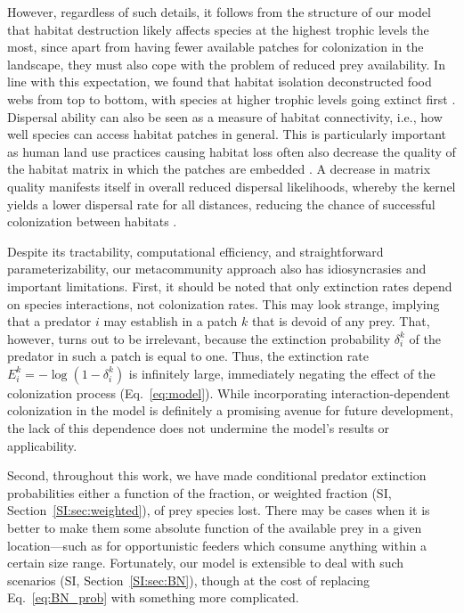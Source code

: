 \documentclass[11pt]{article}
\newcommand{\SI}{SI}
\begin{document}
However, regardless of such details, it follows from the structure of our model that habitat destruction likely affects species at the highest trophic levels the most, since apart from having fewer available patches for colonization in the landscape, they must also cope with the problem of reduced prey availability. In line with this expectation, we found that habitat isolation deconstructed food webs from top to bottom, with species at higher trophic levels going extinct first \citep{Ryser2019, McWilliams2019}. Dispersal ability can also be seen as a measure of habitat connectivity, i.e., how well species can access habitat patches in general. This is particularly important as human land use practices causing habitat loss often also decrease the quality of the habitat matrix in which the patches are embedded \citep{Bonte2012}. A decrease in matrix quality manifests itself in overall reduced dispersal likelihoods, whereby the kernel yields a lower dispersal rate for all distances, reducing the chance of successful colonization between habitats \citep{Eklof2012}. 

Despite its tractability, computational efficiency, and straightforward parameterizability, our metacommunity approach also has idiosyncrasies and important limitations. First, it should be noted that only extinction rates depend on species interactions, not colonization rates. This may look strange, implying that a predator $i$ may establish in a patch $k$ that is devoid of any prey. That, however, turns out to be irrelevant, because the extinction probability $\delta_i^k$ of the predator in such a patch is equal to one. Thus, the extinction rate $E_i^k = -\log(1-\delta_i^k)$ is infinitely large, immediately negating the effect of the colonization process (Eq.~\ref{eq:model}). While incorporating interaction-dependent colonization in the model is definitely a promising avenue for future development, the lack of this dependence does not undermine the model's results or applicability.

Second, throughout this work, we have made conditional predator extinction probabilities either a function of the fraction, or weighted fraction (\SI, Section~\ref{SI:sec:weighted}), of prey species lost. There may be cases when it is better to make them some absolute function of the available prey in a given location---such as for opportunistic feeders which consume anything within a certain size range. Fortunately, our model is extensible to deal with such scenarios (\SI, Section~\ref{SI:sec:BN}), though at the cost of replacing Eq.~\ref{eq:BN_prob} with something more complicated.
\end{document}
